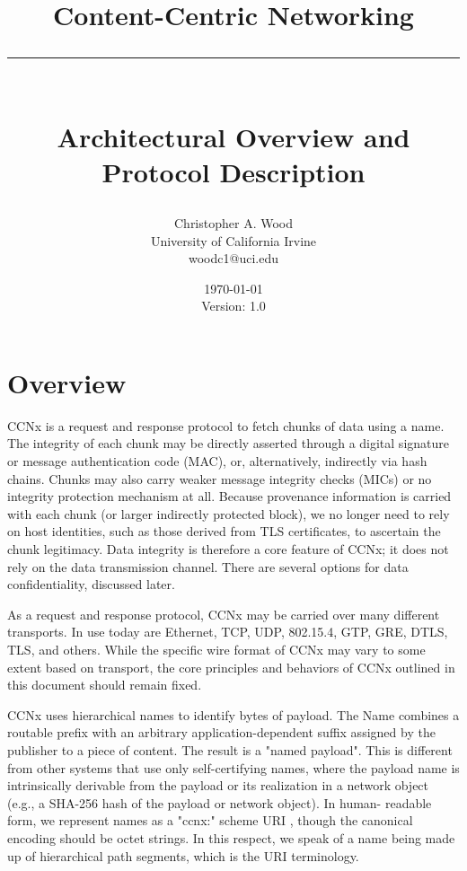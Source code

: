 \documentclass[12pt]{article}
\newcommand{\HRule}[1]{\rule{\linewidth}{#1}}
\begin{document}
\title{ \LARGE \textbf{Content-Centric Networking}
        \HRule{2pt} \\ [0.5cm]
        \large Architectural Overview and Protocol Description}

\date{\today \\ Version: 1.0}

\author{Christopher A. Wood \\
        University of California Irvine \\
        woodc1@uci.edu}

\maketitle
\tableofcontents
\newpage

\section{Overview}
CCNx is a request and response protocol to fetch chunks of data using
a name.  The integrity of each chunk may be directly asserted through
a digital signature or message authentication code (MAC), or,
alternatively, indirectly via hash chains.  Chunks may also carry
weaker message integrity checks (MICs) or no integrity protection
mechanism at all.  Because provenance information is carried with
each chunk (or larger indirectly protected block), we no longer need
to rely on host identities, such as those derived from TLS
certificates, to ascertain the chunk legitimacy.  Data integrity is
therefore a core feature of CCNx; it does not rely on the data
transmission channel.  There are several options for data
confidentiality, discussed later.

As a request and response protocol, CCNx may be carried over many
different transports.  In use today are Ethernet, TCP, UDP, 802.15.4,
GTP, GRE, DTLS, TLS, and others.  While the specific wire format of
CCNx may vary to some extent based on transport, the core principles
and behaviors of CCNx outlined in this document should remain fixed.

CCNx uses hierarchical names to identify bytes of payload.  The Name
combines a routable prefix with an arbitrary application-dependent
suffix assigned by the publisher to a piece of content.  The result
is a "named payload".  This is different from other systems that use
only self-certifying names, where the payload name is intrinsically
derivable from the payload or its realization in a network object
(e.g., a SHA-256 hash of the payload or network object).  In human-
readable form, we represent names as a "ccnx:" scheme URI
\cite{berners2014rfc}, though the canonical encoding should be octet strings.  In
this respect, we speak of a name being made up of hierarchical path
segments, which is the URI terminology.
\end{document}
